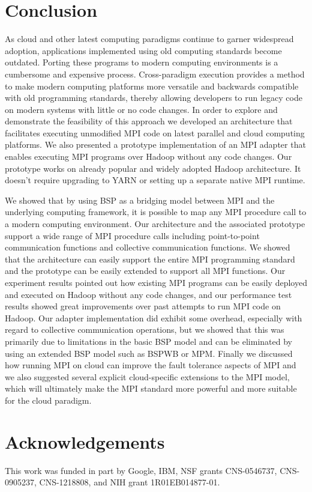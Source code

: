 \documentclass[conference,10pt] {IEEEtran}
\begin{document}
\section{Conclusion} 
\label{sec:conclusion}
As cloud and other latest computing paradigms continue to garner widespread adoption, applications implemented using old computing standards become outdated. Porting these programs to modern computing environments is a cumbersome and expensive process. Cross-paradigm execution provides a method to make modern computing platforms more versatile and backwards compatible with old programming standards, thereby allowing developers to run legacy code on modern systems with little or no code changes. In order to explore and demonstrate the feasibility of this approach we developed an architecture that facilitates executing unmodified MPI code on latest parallel and cloud computing platforms. We also presented a prototype implementation of an MPI adapter that enables executing MPI programs over Hadoop without any code changes. Our prototype works on already popular and widely adopted Hadoop architecture. It doesn't require upgrading to YARN or setting up a separate native MPI runtime. 

We showed that by using BSP as a bridging model between MPI and the underlying computing framework, it is possible to map any MPI procedure call to a modern computing environment. Our architecture and the associated prototype support a wide range of MPI procedure calls including point-to-point communication functions and collective communication functions. We showed that the architecture can easily support the entire MPI programming standard and the prototype can be easily extended to support all MPI functions. Our experiment results pointed out how existing MPI programs can be easily deployed and executed on Hadoop without any code changes, and our performance test results showed great improvements over past attempts to run MPI code on Hadoop. Our adapter implementation did exhibit some overhead, especially with regard to collective communication operations, but we showed that this was primarily due to limitations in the basic BSP model and can be eliminated by using an extended BSP model such as BSPWB or MPM. Finally we discussed how running MPI on cloud can improve the fault tolerance aspects of MPI and we also suggested several explicit cloud-specific extensions to the MPI model, which will ultimately make the MPI standard more powerful and more suitable for the cloud paradigm. 

\section{Acknowledgements}
This work was funded in part by Google, IBM, NSF grants CNS-0546737, CNS-0905237, CNS-1218808, and NIH grant 1R01EB014877-01.



\end{document}
